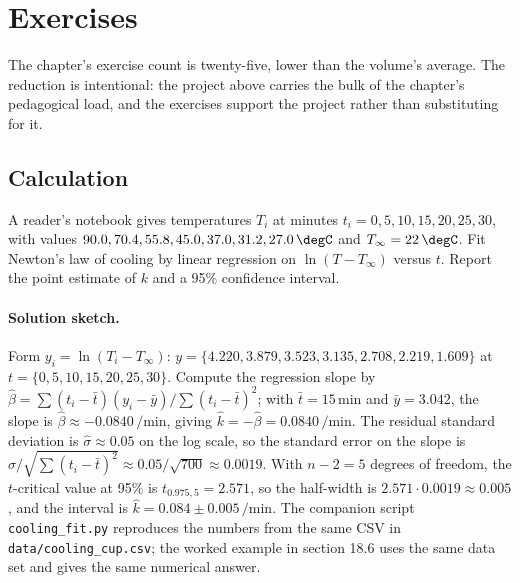 \section{Exercises}

The chapter's exercise count is twenty-five, lower than the
volume's average. The reduction is intentional: the project
above carries the bulk of the chapter's pedagogical load, and
the exercises support the project rather than substituting for
it.

\subsection*{Calculation}

\begin{exercise}
A reader's notebook gives temperatures $T_{i}$ at minutes
$t_{i} = 0, 5, 10, 15, 20, 25, 30$, with values $90.0, 70.4,
55.8, 45.0, 37.0, 31.2, 27.0\,\degC$ and $T_{\infty} =
22\,\degC$. Fit Newton's law of cooling by linear regression on
$\ln(T - T_{\infty})$ versus $t$. Report the point estimate of
$k$ and a 95\% confidence interval.

\paragraph{Solution sketch.} Form $y_{i} = \ln(T_{i} - T_{\infty})$:
$y = \{4.220, 3.879, 3.523, 3.135, 2.708, 2.219, 1.609\}$ at
$t = \{0, 5, 10, 15, 20, 25, 30\}$. Compute the regression slope by
$\hat\beta = \sum(t_{i} - \bar t)(y_{i} - \bar y) / \sum(t_{i} -
\bar t)^{2}$; with $\bar t = 15\,\text{min}$ and $\bar y = 3.042$,
the slope is $\hat\beta \approx -0.0840\,\si{\per\minute}$, giving
$\hat k = -\hat\beta = 0.0840\,\si{\per\minute}$. The residual
standard deviation is $\hat\sigma \approx 0.05$ on the log scale,
so the standard error on the slope is $\hat\sigma /
\sqrt{\sum(t_{i} - \bar t)^{2}} \approx 0.05/\sqrt{700} \approx
0.0019$. With $n - 2 = 5$ degrees of freedom, the $t$-critical
value at 95\% is $t_{0.975, 5} = 2.571$, so the half-width is
$2.571 \cdot 0.0019 \approx 0.005$, and the interval is
$\hat k = 0.084 \pm 0.005\,\si{\per\minute}$. The companion script
\texttt{cooling\_fit.py} reproduces the numbers from the same CSV
in \texttt{data/cooling\_cup.csv}; the worked example in section
18.6 uses the same data set and gives the same numerical answer.
\end{exercise}

